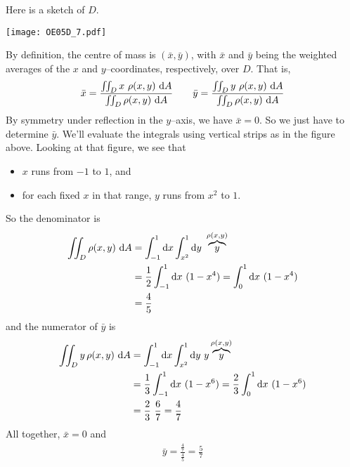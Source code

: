 \begin{solution}
Here is a sketch of $D$.

\begin{center}
     \texttt{[image: OE05D\_7.pdf]}
\end{center}

By definition, the centre of mass is $(\bar x, \bar y)$,
with $\bar x$ and $\bar y$ being the weighted averages  of the $x$ and 
$y$--coordinates, respectively, over $D$. That is,
\begin{align*}
\bar x = \frac{\dblInt_D x\ \rho(x,y)\ \dee{A}}{\dblInt_D \rho(x,y)\ \dee{A}}
\qquad
\bar y = \frac{\dblInt_D y\ \rho(x,y)\ \dee{A}}{\dblInt_D \rho(x,y)\ \dee{A}}
\end{align*}
By symmetry under reflection in the $y$--axis, we have $\bar x=0$.
So we just have to determine $\bar y$. 
We'll evaluate the integrals using vertical strips as in the figure above.
Looking at that figure, we see that
\begin{itemize}
\item 
$x$ runs from $-1$ to $1$, and
\item
for each fixed $x$ in that range, $y$ runs from $x^2$ to $1$.
\end{itemize}
So the denominator is
\begin{align*}
\iint_D \rho(x,y)\ \mathrm{d}A
&= \int_{-1}^1\mathrm{d}x\int_{x^2}^1\mathrm{d}y\ \overbrace{y}^{\rho(x,y)} \\
&= \frac{1}{2}\int_{-1}^1 \mathrm{d}x\ (1-x^4)
 =\int_0^1 \mathrm{d}x\ (1-x^4) \\
&=\frac{4}{5}
\end{align*}
and the numerator of $\bar y$ is
\begin{align*}
\iint_D y\,\rho(x,y)\ \mathrm{d}A
&= \int_{-1}^1\mathrm{d}x\int_{x^2}^1\mathrm{d}y\ y\overbrace{y}^{\rho(x,y)} \\
&= \frac{1}{3}\int_{-1}^1 \mathrm{d}x\ (1-x^6)
 =\frac{2}{3}\int_0^1 \mathrm{d}x\ (1-x^6) \\
&=\frac{2}{3}\ \frac{6}{7} = \frac{4}{7}
\end{align*}
All together, $\bar x=0$ and
\begin{align*}
\bar y = \frac{\frac{4}{7}} {\frac{4}{5}}
       =  \frac{5}{7}
\end{align*}
\end{solution}

